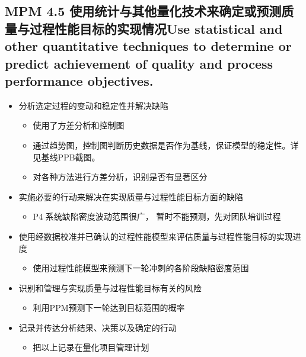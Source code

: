 \hypertarget{mpm-4.5-ux4f7fux7528ux7edfux8ba1ux4e0eux5176ux4ed6ux91cfux5316ux6280ux672fux6765ux786eux5b9aux6216ux9884ux6d4bux8d28ux91cfux4e0eux8fc7ux7a0bux6027ux80fdux76eeux6807ux7684ux5b9eux73b0ux60c5ux51b5use-statistical-and-other-quantitative-techniques-to-determine-or-predict-achievement-of-quality-and-process-performance-objectives.}{%
\subsection{MPM 4.5
使用统计与其他量化技术来确定或预测质量与过程性能目标的实现情况Use
statistical and other quantitative techniques to determine or predict
achievement of quality and process performance
objectives.}\label{mpm-4.5-ux4f7fux7528ux7edfux8ba1ux4e0eux5176ux4ed6ux91cfux5316ux6280ux672fux6765ux786eux5b9aux6216ux9884ux6d4bux8d28ux91cfux4e0eux8fc7ux7a0bux6027ux80fdux76eeux6807ux7684ux5b9eux73b0ux60c5ux51b5use-statistical-and-other-quantitative-techniques-to-determine-or-predict-achievement-of-quality-and-process-performance-objectives.}}

\begin{itemize}
\tightlist
\item
  分析选定过程的变动和稳定性并解决缺陷

  \begin{itemize}
  \tightlist
  \item
    使用了方差分析和控制图
  \item
    通过趋势图，控制图判断历史数据是否作为基线，保证模型的稳定性。详见基线PPB截图。
  \item
    对各种方法进行方差分析，识别是否有显著区分
  \end{itemize}
\item
  实施必要的行动来解决在实现质量与过程性能目标方面的缺陷

  \begin{itemize}
  \tightlist
  \item
    P4 系统缺陷密度波动范围很广， 暂时不能预测，先对团队培训过程
  \end{itemize}
\item
  使用经数据校准并已确认的过程性能模型来评估质量与过程性能目标的实现进度

  \begin{itemize}
  \tightlist
  \item
    使用过程性能模型来预测下一轮冲刺的各阶段缺陷密度范围
  \end{itemize}
\item
  识别和管理与实现质量与过程性能目标有关的风险

  \begin{itemize}
  \tightlist
  \item
    利用PPM预测下一轮达到目标范围的概率
  \end{itemize}
\item
  记录并传达分析结果、决策以及确定的行动

  \begin{itemize}
  \tightlist
  \item
    把以上记录在量化项目管理计划
  \end{itemize}
\end{itemize}

